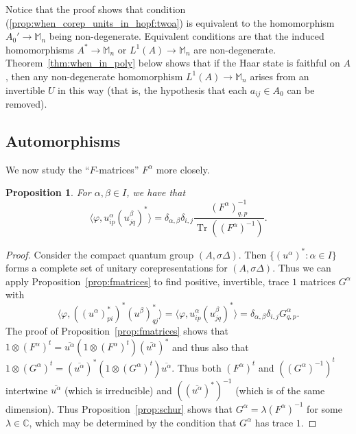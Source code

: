 \documentclass[twoside,a4paper,12pt]{article}
\theoremstyle{plain}
\newtheorem{proposition}{Proposition}[section]
\theoremstyle{definition}
\newcommand{\ip}[2]{\langle #1,#2 \rangle}
\newcommand{\tr}{\operatorname{Tr}}
\begin{document}
Notice that the proof shows that condition
(\ref{prop:when_corep_units_in_hopf:twoa}) is equivalent to the homomorphism
$A_0' \rightarrow \mathbb M_n$ being non-degenerate.  Equivalent conditions
are that the induced homomorphisms $A^*\rightarrow\mathbb M_n$ or
$L^1(A)\rightarrow\mathbb M_n$ are non-degenerate.
Theorem~\ref{thm:when_in_poly} below shows that if the Haar state is
faithful on $A$, then any non-degenerate homomorphism $L^1(A)\rightarrow
\mathbb M_n$ arises from an invertible $U$ in this way (that is, the
hypothesis that each $a_{ij}\in A_0$ can be removed).





\subsection{Automorphisms}

We now study the ``$F$-matrices'' $F^\alpha$ more closely.

\begin{proposition}\label{prop:haarotherway}
For $\alpha,\beta\in I$, we have that
\[ \ip{\varphi}{u^\alpha_{ip} (u^\beta_{jq})^*}
= \delta_{\alpha,\beta} \delta_{i,j} \frac{(F^\alpha)^{-1}_{q,p}}
{\tr((F^\alpha)^{-1})}. \]
\end{proposition}
\begin{proof}
Consider the compact quantum group $(A,\sigma\Delta)$.  Then
$\{ (u^\alpha)^* : \alpha\in I\}$ forms a complete set of unitary 
corepresentations for $(A,\sigma\Delta)$.  Thus we can apply
Proposition~\ref{prop:fmatrices} to find positive, invertible, trace $1$
matrices $G^\alpha$ with
\[ \ip{\varphi}{((u^\alpha)^*_{pi})^* (u^\beta)^*_{qj}}
= \ip{\varphi}{u^\alpha_{ip} (u^\beta_{jq})^*}
= \delta_{\alpha,\beta} \delta_{i,j} G^\alpha_{q,p}. \]
The proof of Proposition~\ref{prop:fmatrices} shows that
$1\otimes (F^\alpha)^t = \overline{u^\alpha}(1\otimes (F^\alpha)^t)
(\overline{u^\alpha})^*$ and thus also that $1\otimes (G^\alpha)^t
= (\overline{u^\alpha})^* (1\otimes (G^\alpha)^t) \overline{u^\alpha}$.
Thus both $(F^\alpha)^t$ and $((G^\alpha)^{-1})^t$ intertwine
$\overline{u^\alpha}$ (which is irreducible) and
$((\overline{u^\alpha})^*)^{-1}$ (which is of the same dimension).
Thus Proposition~\ref{prop:schur} shows that
$G^\alpha = \lambda (F^\alpha)^{-1}$ for some $\lambda\in\mathbb C$,
which may be determined by the condition that $G^\alpha$ has trace $1$.
\end{proof}
\end{document}
